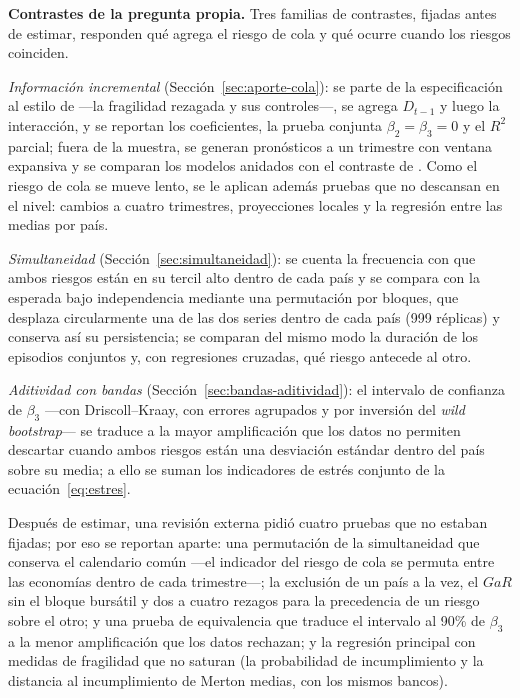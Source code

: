 \textbf{Contrastes de la pregunta propia.} Tres familias de contrastes, fijadas antes de estimar, responden qué agrega el riesgo de cola y qué ocurre cuando los riesgos coinciden.

\emph{Información incremental} (Sección~\ref{sec:aporte-cola}): se parte de la especificación al estilo de \citet{Chari2024b} ---la fragilidad rezagada y sus controles---, se agrega $D_{t-1}$ y luego la interacción, y se reportan los coeficientes, la prueba conjunta $\beta_2=\beta_3=0$ y el $R^2$ parcial; fuera de la muestra, se generan pronósticos a un trimestre con ventana expansiva y se comparan los modelos anidados con el contraste de \citet{ClarkWest2007}. Como el riesgo de cola se mueve lento, se le aplican además pruebas que no descansan en el nivel: cambios a cuatro trimestres, proyecciones locales y la regresión entre las medias por país.

\emph{Simultaneidad} (Sección~\ref{sec:simultaneidad}): se cuenta la frecuencia con que ambos riesgos están en su tercil alto dentro de cada país y se compara con la esperada bajo independencia mediante una permutación por bloques, que desplaza circularmente una de las dos series dentro de cada país (999 réplicas) y conserva así su persistencia; se comparan del mismo modo la duración de los episodios conjuntos y, con regresiones cruzadas, qué riesgo antecede al otro.

\emph{Aditividad con bandas} (Sección~\ref{sec:bandas-aditividad}): el intervalo de confianza de $\beta_3$ ---con Driscoll--Kraay, con errores agrupados y por inversión del \textit{wild bootstrap}--- se traduce a la mayor amplificación que los datos no permiten descartar cuando ambos riesgos están una desviación estándar dentro del país sobre su media; a ello se suman los indicadores de estrés conjunto de la ecuación~\eqref{eq:estres}.

Después de estimar, una revisión externa pidió cuatro pruebas que no estaban fijadas; por eso se reportan aparte: una permutación de la simultaneidad que conserva el calendario común ---el indicador del riesgo de cola se permuta entre las economías dentro de cada trimestre---; la exclusión de un país a la vez, el $GaR$ sin el bloque bursátil y dos a cuatro rezagos para la precedencia de un riesgo sobre el otro; y una prueba de equivalencia \citep{Schuirmann1987} que traduce el intervalo al 90\% de $\beta_3$ a la menor amplificación que los datos rechazan; y la regresión principal con medidas de fragilidad que no saturan (la probabilidad de incumplimiento y la distancia al incumplimiento de Merton medias, con los mismos bancos).

